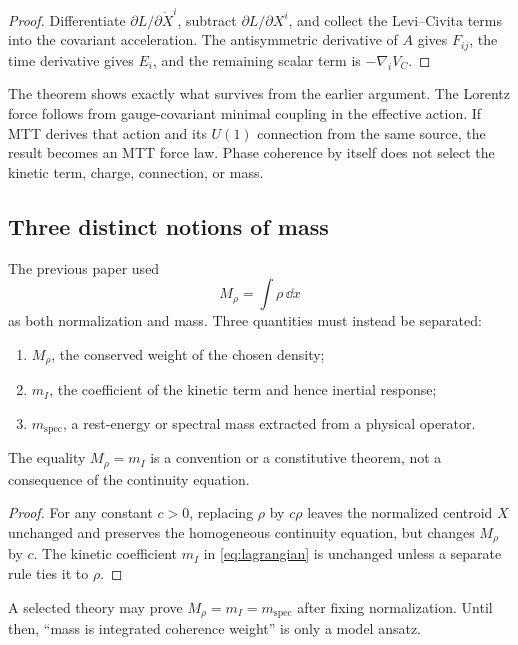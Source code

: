 \documentclass[11pt]{article}
\begin{document}
\begin{proof}
Differentiate $\partial L/\partial\dot X^i$, subtract
$\partial L/\partial X^i$, and collect the Levi--Civita terms into the
covariant acceleration.  The antisymmetric derivative of $A$ gives $F_{ij}$,
the time derivative gives $E_i$, and the remaining scalar term is
$-\nabla_iV_C$.
\end{proof}

The theorem shows exactly what survives from the earlier argument.  The
Lorentz force follows from gauge-covariant minimal coupling in the effective
action.  If MTT derives that action and its $U(1)$ connection from the same
source, the result becomes an MTT force law.  Phase coherence by itself does
not select the kinetic term, charge, connection, or mass.

\subsection{Three distinct notions of mass}

The previous paper used
\[
 M_\rho=\int\rho\,\dd x
\]
as both normalization and mass.  Three quantities must instead be separated:
\begin{enumerate}
\item $M_\rho$, the conserved weight of the chosen density;
\item $m_I$, the coefficient of the kinetic term and hence inertial response;
\item $m_{\mathrm{spec}}$, a rest-energy or spectral mass extracted from a
physical operator.
\end{enumerate}

\medskip
\begin{proposition}\label{prop:mass}
The equality $M_\rho=m_I$ is a convention or a constitutive theorem, not a
consequence of the continuity equation.
\end{proposition}

\begin{proof}
For any constant $c>0$, replacing $\rho$ by $c\rho$ leaves the normalized
centroid $X$ unchanged and preserves the homogeneous continuity equation, but
changes $M_\rho$ by $c$.  The kinetic coefficient $m_I$ in
\cref{eq:lagrangian} is unchanged unless a separate rule ties it to $\rho$.
\end{proof}

A selected theory may prove $M_\rho=m_I=m_{\mathrm{spec}}$ after fixing
normalization.  Until then, ``mass is integrated coherence weight'' is only a
model ansatz.
\end{document}
